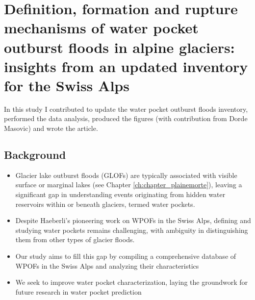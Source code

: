 \chapter{Definition, formation and rupture mechanisms of water pocket outburst floods in alpine glaciers: insights from an updated inventory for the Swiss Alps}
\label{ch:chapter_WPOFs}

In this study I contributed to update the water pocket outburst floods inventory, performed the data analysis, produced the figures (with contribution from Dorde Masovic) and wrote the article. 

\section{Background}

\begin{itemize}


        \item  Glacier lake outburst floods (GLOFs) are typically associated with visible surface or marginal lakes (see Chapter \ref{ch:chapter_plainemorte}), leaving a significant gap in understanding events originating from hidden water reservoirs within or beneath glaciers, termed water pockets.

        \item Despite Haeberli's pioneering work on WPOFs in the Swiss Alps, defining and studying water pockets remains challenging, with ambiguity in distinguishing them from other types of glacier floods.

        \item Our study aims to fill this gap by compiling a comprehensive database of WPOFs in the Swiss Alps and analyzing their characteristics

        \item We seek to improve water pocket characterization, laying the groundwork for future research in water pocket prediction

    \end{itemize}


